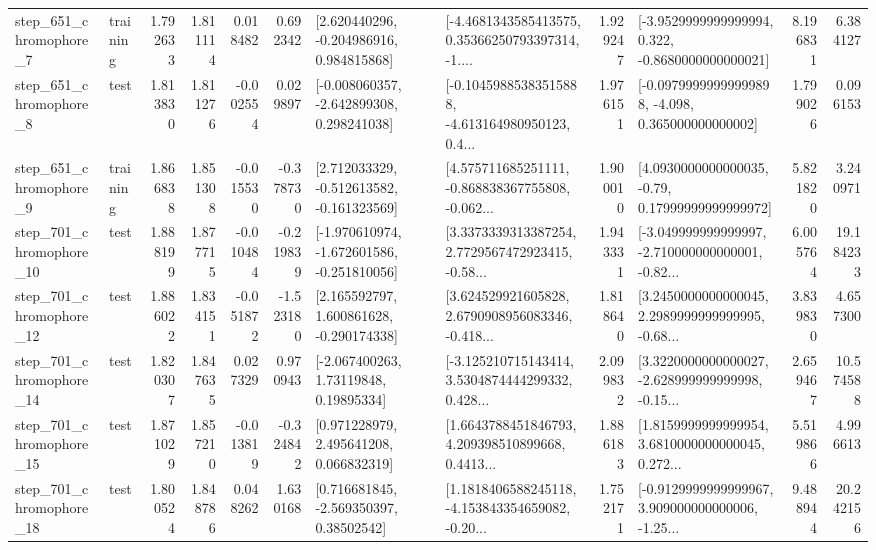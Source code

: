 \begin{tabular}{llrrrrllrlrr}
   step\_651\_chromophore\_7 &  training &      1.792633 &    1.811114 &      0.018482 &  0.692342 &    [2.620440296, -0.204986916, 0.984815868] &  [-4.4681343585413575, 0.35366250793397314, -1.... &       1.929247 &  [-3.9529999999999994, 0.322, -0.8680000000000021] &            8.196831 &          6.384127 \\
   step\_651\_chromophore\_8 &      test &      1.813830 &    1.811276 &     -0.002554 &  0.029897 &   [-0.008060357, -2.642899308, 0.298241038] &  [-0.10459885383515888, -4.613164980950123, 0.4... &       1.976151 &  [-0.09799999999999898, -4.098, 0.365000000000002] &            1.799026 &          0.096153 \\
   step\_651\_chromophore\_9 &  training &      1.866838 &    1.851308 &     -0.015530 & -0.378730 &   [2.712033329, -0.512613582, -0.161323569] &  [4.575711685251111, -0.868838367755808, -0.062... &       1.900010 &   [4.0930000000000035, -0.79, 0.17999999999999972] &            5.821820 &          3.240971 \\
  step\_701\_chromophore\_10 &      test &      1.888199 &    1.877715 &     -0.010484 & -0.219839 &  [-1.970610974, -1.672601586, -0.251810056] &  [3.3373339313387254, 2.7729567472923415, -0.58... &       1.943331 &  [-3.049999999999997, -2.710000000000001, -0.82... &            6.005764 &         19.184233 \\
  step\_701\_chromophore\_12 &      test &      1.886022 &    1.834151 &     -0.051872 & -1.523180 &    [2.165592797, 1.600861628, -0.290174338] &  [3.624529921605828, 2.6790908956083346, -0.418... &       1.818640 &  [3.2450000000000045, 2.2989999999999995, -0.68... &            3.839830 &          4.657300 \\
  step\_701\_chromophore\_14 &      test &      1.820307 &    1.847635 &      0.027329 &  0.970943 &      [-2.067400263, 1.73119848, 0.19895334] &  [-3.125210715143414, 3.5304874444299332, 0.428... &       2.099832 &  [3.3220000000000027, -2.628999999999998, -0.15... &            2.659467 &         10.574588 \\
  step\_701\_chromophore\_15 &      test &      1.871029 &    1.857210 &     -0.013819 & -0.324842 &     [0.971228979, 2.495641208, 0.066832319] &  [1.6643788451846793, 4.209398510899668, 0.4413... &       1.886183 &  [1.8159999999999954, 3.6810000000000045, 0.272... &            5.519866 &          4.996613 \\
  step\_701\_chromophore\_18 &      test &      1.800524 &    1.848786 &      0.048262 &  1.630168 &     [0.716681845, -2.569350397, 0.38502542] &  [1.1818406588245118, -4.153843354659082, -0.20... &       1.752171 &  [-0.9129999999999967, 3.909000000000006, -1.25... &            9.488944 &         20.242156 \\

\end{tabular}
